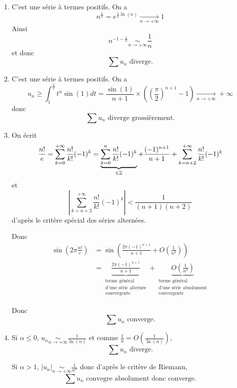 \begin{solution}
	\begin{enumerate}
		\item C'est une série à termes positifs. On a 
		$$n^{\frac{1}{n}}=e^{\frac{1}{n}\ln\left(n\right)}\xrightarrow[n\to+\infty]{}1$$
		Ainsi
		$$n^{-1-\frac{1}{n}}\underset{n\to+\infty}{\sim}\frac{1}{n}$$
		et donc 
		$$\boxed{\sum u_{n}\text{ diverge.}}$$

		\item C'est une série à termes positifs. On a 
		$$u_{n}\geqslant \int_{1}^{\frac{\pi}{2}}t^{n}\sin(1)dt=\frac{\sin(1)}{n+1}\times\left(\left(\frac{\pi}{2}\right)^{n+1}-1\right)\xrightarrow[n\to+\infty]{}+\infty$$
		donc 
		$$\boxed{\sum u_{n}\text{ diverge grossièrement.}}$$

		\item On écrit 
		$$\frac{n!}{e}=\sum_{k=0}^{+\infty}\frac{n!}{k!}(-1)^{k}=\underbrace{\sum_{k=0}^{n}\frac{n!}{k!}(-1)^{k}}_{\in\mathbb{Z}}+\frac{(-1)^{n+1}}{n+1}+\sum_{k=n+2}^{+\infty}\frac{n!}{k!}(-1)^{k}$$
		et
		$$\left\vert\sum_{k=n+2}^{+\infty}\frac{n!}{k!}(-1)^{k}\right\vert<\frac{1}{(n+1)(n+2)}$$
		d'après le critère spécial des séries alternées.

		Donc 
		\begin{align*}
			\sin\left(2\pi\frac{n!}{e}\right)
			&=\sin\left(\frac{2\pi(-1)^{n+1}}{n+1}+O\left(\frac{1}{n^{2}}\right)\right)\\
			&=\underbrace{\frac{2\pi(-1)^{n+1}}{n+1}}_{\substack{\text{terme général}\\\text{d'une série alternée}\\\text{convergente}}}+\underbrace{O\left(\frac{1}{n^{2}}\right)}_{\substack{\text{terme général}\\\text{d'une série absolument}\\\text{convergente}}}
		\end{align*}
		
		Donc
		$$\boxed{\sum u_{n}\text{ converge.}}$$

		\item Si $\alpha\leqslant0$, $u_{n}\underset{n\to+\infty}{\sim}\frac{1}{\ln(n)}$ et comme $\frac{1}{n}=O\left(\frac{1}{\ln(n)}\right)$, 
		$$\boxed{\sum u_{n}\text{ diverge.}}$$

		Si $\alpha>1$, $\vert u_{n}\vert\underset{n\to+\infty}{\sim}\frac{1}{n^{\alpha}}$ donc d'après le critère de Riemann,
		$$\boxed{\sum u_{n}\text{ convegre absolument donc converge.}}$$


\end{enumerate}
\end{solution}

